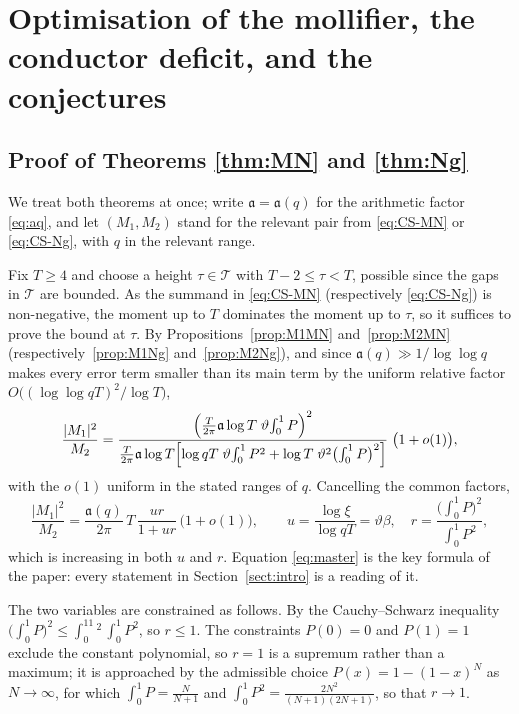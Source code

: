 \documentclass[12pt,a4paper,reqno]{amsart}
\theoremstyle{remark}
\numberwithin{equation}{section}
\begin{document}
\section{Optimisation of the mollifier, the conductor deficit, and the conjectures}\label{sect:opt}

\subsection{Proof of Theorems \ref{thm:MN} and \ref{thm:Ng}}
We treat both theorems at once; write $\mathfrak a=\mathfrak a(q)$ for the arithmetic factor \eqref{eq:aq}, and let $(M_1,M_2)$ stand for the relevant pair from \eqref{eq:CS-MN} or \eqref{eq:CS-Ng}, with $q$ in the relevant range.

Fix $T\ge4$ and choose a height $\tau\in\mathcal T$ with $T-2\le\tau<T$, possible since the gaps in $\mathcal T$ are bounded. As the summand in \eqref{eq:CS-MN} (respectively \eqref{eq:CS-Ng}) is non-negative, the moment up to $T$ dominates the moment up to $\tau$, so it suffices to prove the bound at $\tau$. By Propositions~\ref{prop:M1MN} and~\ref{prop:M2MN} (respectively~\ref{prop:M1Ng} and~\ref{prop:M2Ng}), and since $\mathfrak a(q)\gg1/\log\log q$ makes every error term smaller than its main term by the uniform relative factor $O\bigl((\log\log qT)^2/\log T\bigr)$,
\[
\frac{|M_1|^2}{M_2}
=\frac{\Bigl(\frac{T}{2\pi}\mathfrak a\log T\;\vartheta\!\int_0^1 P\Bigr)^2}{\frac{T}{2\pi}\mathfrak a\log T\Bigl[\log qT\;\vartheta\!\int_0^1 P^2+\log T\;\vartheta^2\bigl(\int_0^1 P\bigr)^2\Bigr]}\;\bigl(1+o(1)\bigr),
\]
with the $o(1)$ uniform in the stated ranges of $q$. Cancelling the common factors,
\begin{equation}\label{eq:master}
\frac{|M_1|^2}{M_2}=\frac{\mathfrak a(q)}{2\pi}\,T\,\frac{ur}{1+ur}\,\bigl(1+o(1)\bigr),
\qquad
u=\frac{\log\xi}{\log qT}=\vartheta\beta,
\quad
r=\frac{\bigl(\int_0^1 P\bigr)^2}{\int_0^1 P^2},
\end{equation}
which is increasing in both $u$ and $r$. Equation \eqref{eq:master} is the key formula of the paper: every statement in Section~\ref{sect:intro} is a reading of it.

The two variables are constrained as follows. By the Cauchy--Schwarz inequality $\bigl(\int_0^1 P\bigr)^2\le\int_0^11^2\,\int_0^1P^2$, so $r\le1$. The constraints $P(0)=0$ and $P(1)=1$ exclude the constant polynomial, so $r=1$ is a supremum rather than a maximum; it is approached by the admissible choice $P(x)=1-(1-x)^N$ as $N\to\infty$, for which $\int_0^1P=\tfrac{N}{N+1}$ and $\int_0^1P^2=\tfrac{2N^2}{(N+1)(2N+1)}$, so that $r\to1$.
\end{document}
